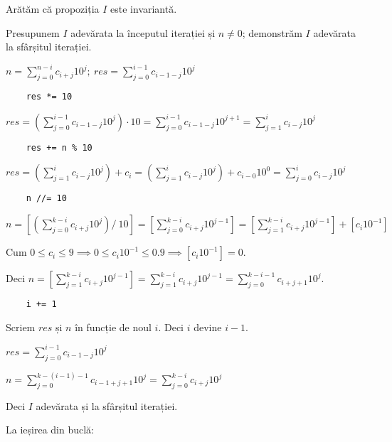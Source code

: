 \documentclass[11pt]{article}
\begin{document}
Arătăm că propoziția $I$ este invariantă.

Presupunem $I$ adevărata la începutul iterației și $n \ne 0$; demonstrăm $I$ adevărata la sfârșitul iterației.

$n = \sum\limits_{j=0}^{n-i}c_{i+j}10^{j};\ 
\mathit{res} = \sum\limits_{j=0}^{i-1}c_{i-1-j}10^{j}
$
\begin{verbatim}
    res *= 10
\end{verbatim}

$\mathit{res} = \left( \sum\limits_{j=0}^{i-1}c_{i-1-j}10^{j} \right) \cdot 10 
= \sum\limits_{j=0}^{i-1}c_{i-1-j}10^{j+1} 
= \sum\limits_{j=1}^{i}c_{i-j}10^{j}
$
\begin{verbatim}
    res += n % 10
\end{verbatim}

$\mathit{res} = \left( \sum\limits_{j=1}^{i}c_{i-j}10^{j} \right) + c_{i} 
= \left( \sum\limits_{j=1}^{i}c_{i-j}10^{j} \right) + c_{i-0}10^{0} 
= \sum\limits_{j=0}^{i}c_{i-j}10^{j}$

\begin{verbatim}
    n //= 10
\end{verbatim}

$n = \left[ \left( \sum\limits_{j=0}^{k-i}c_{i+j}10^{j} \right) / \ 10 \right]
= \left[ \sum\limits_{j=0}^{k-i}c_{i+j}10^{j-1} \right]
= \left[ \sum\limits_{j=1}^{k-i}c_{i+j}10^{j-1} \right] + \left[c_{i}10^{-1} \right]
$

Cum $0 \le c_{i} \le 9 \implies 0 \le c_{i}10^{-1} \le 0.9 \implies \left[c_{i}10^{-1} \right] = 0$.

Deci $n = \left[ \sum\limits_{j=1}^{k-i}c_{i+j}10^{j-1} \right] = \sum\limits_{j=1}^{k-i}c_{i+j}10^{j-1} = \sum\limits_{j=0}^{k-i-1}c_{i+j+1}10^{j}$. 

\begin{verbatim}
    i += 1
\end{verbatim}

Scriem $\mathit{res}$ și $n$ în funcție de noul $i$. Deci $i$ devine $i-1$.


$\mathit{res} = \sum\limits_{j=0}^{i-1}c_{i-1-j}10^{j}$

$n = \sum\limits_{j=0}^{k-(i-1)-1}c_{i-1+j+1}10^{j} = \sum\limits_{j=0}^{k-i}c_{i+j}10^{j} $

Deci $I$ adevărata și la sfârșitul iterației.


\vspace{14pt}
La ieșirea din buclă:
\end{document}
